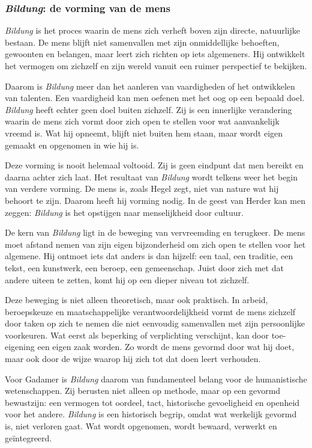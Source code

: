 \documentclass[11pt,twoside,openright]{memoir}
\begin{document}
\subsubsection{\textit{Bildung}: de vorming van de mens}

\textit{Bildung} is het proces waarin de mens zich verheft boven zijn directe, natuurlijke bestaan. De mens blijft niet samenvallen met zijn onmiddellijke behoeften, gewoonten en belangen, maar leert zich richten op iets algemeners. Hij ontwikkelt het vermogen om zichzelf en zijn wereld vanuit een ruimer perspectief te bekijken.

Daarom is \textit{Bildung} meer dan het aanleren van vaardigheden of het ontwikkelen van talenten. Een vaardigheid kan men oefenen met het oog op een bepaald doel. \textit{Bildung} heeft echter geen doel buiten zichzelf. Zij is een innerlijke verandering waarin de mens zich vormt door zich open te stellen voor wat aanvankelijk vreemd is. Wat hij opneemt, blijft niet buiten hem staan, maar wordt eigen gemaakt en opgenomen in wie hij is.

Deze vorming is nooit helemaal voltooid. Zij is geen eindpunt dat men bereikt en daarna achter zich laat. Het resultaat van \textit{Bildung} wordt telkens weer het begin van verdere vorming. De mens is, zoals Hegel zegt, niet van nature wat hij behoort te zijn. Daarom heeft hij vorming nodig. In de geest van Herder kan men zeggen: \textit{Bildung} is het opstijgen naar menselijkheid door cultuur.

De kern van \textit{Bildung} ligt in de beweging van vervreemding en terugkeer. De mens moet afstand nemen van zijn eigen bijzonderheid om zich open te stellen voor het algemene. Hij ontmoet iets dat anders is dan hijzelf: een taal, een traditie, een tekst, een kunstwerk, een beroep, een gemeenschap. Juist door zich met dat andere uiteen te zetten, komt hij op een dieper niveau tot zichzelf.

Deze beweging is niet alleen theoretisch, maar ook praktisch. In arbeid, beroepskeuze en maatschappelijke verantwoordelijkheid vormt de mens zichzelf door taken op zich te nemen die niet eenvoudig samenvallen met zijn persoonlijke voorkeuren. Wat eerst als beperking of verplichting verschijnt, kan door toe-eigening een eigen zaak worden. Zo wordt de mens gevormd door wat hij doet, maar ook door de wijze waarop hij zich tot dat doen leert verhouden.

Voor Gadamer is \textit{Bildung} daarom van fundamenteel belang voor de humanistische wetenschappen. Zij berusten niet alleen op methode, maar op een gevormd bewustzijn: een vermogen tot oordeel, tact, historische gevoeligheid en openheid voor het andere. \textit{Bildung} is een historisch begrip, omdat wat werkelijk gevormd is, niet verloren gaat. Wat wordt opgenomen, wordt bewaard, verwerkt en geïntegreerd.
\end{document}
